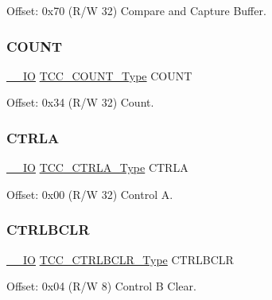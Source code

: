 Offset\+: 0x70 (R/W 32) Compare and Capture Buffer. 

\mbox{\label{struct_tcc_a9557ee66e5d5d14ee25936822ac5ed87}} 
\subsubsection{\texorpdfstring{COUNT}{COUNT}}
{\footnotesize\ttfamily \mbox{\hyperlink{core__cm0plus_8h_aec43007d9998a0a0e01faede4133d6be}{\+\_\+\+\_\+\+IO}} \mbox{\hyperlink{union_t_c_c___c_o_u_n_t___type}{T\+C\+C\+\_\+\+C\+O\+U\+N\+T\+\_\+\+Type}} C\+O\+U\+NT}



Offset\+: 0x34 (R/W 32) Count. 

\mbox{\label{struct_tcc_aa651e8406e628b45f41caf390b339049}} 
\subsubsection{\texorpdfstring{CTRLA}{CTRLA}}
{\footnotesize\ttfamily \mbox{\hyperlink{core__cm0plus_8h_aec43007d9998a0a0e01faede4133d6be}{\+\_\+\+\_\+\+IO}} \mbox{\hyperlink{union_t_c_c___c_t_r_l_a___type}{T\+C\+C\+\_\+\+C\+T\+R\+L\+A\+\_\+\+Type}} C\+T\+R\+LA}



Offset\+: 0x00 (R/W 32) Control A. 

\mbox{\label{struct_tcc_acdcc7ad4d23d1ba99a7958f6216f9152}} 
\subsubsection{\texorpdfstring{CTRLBCLR}{CTRLBCLR}}
{\footnotesize\ttfamily \mbox{\hyperlink{core__cm0plus_8h_aec43007d9998a0a0e01faede4133d6be}{\+\_\+\+\_\+\+IO}} \mbox{\hyperlink{union_t_c_c___c_t_r_l_b_c_l_r___type}{T\+C\+C\+\_\+\+C\+T\+R\+L\+B\+C\+L\+R\+\_\+\+Type}} C\+T\+R\+L\+B\+C\+LR}



Offset\+: 0x04 (R/W 8) Control B Clear. 

\mbox{\label{struct_tcc_aa5b2b1748fa05c22acd1e9db0224b01f}} 
